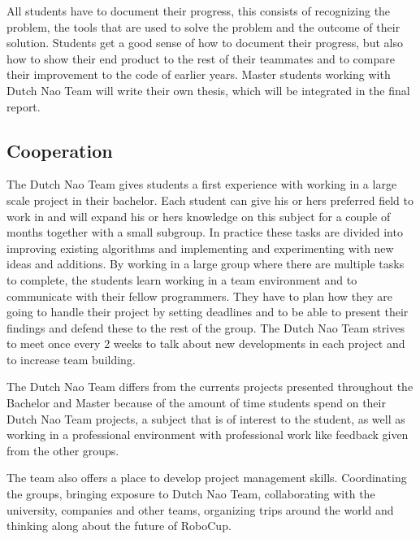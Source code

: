 \documentclass[11pt]{article}
\begin{document}
All students have to document their progress, this consists of recognizing the problem, the tools that are used to solve the problem and the outcome of their solution. Students get a good sense of how to document their progress, but also how to show their end product to the rest of their teammates and to compare their improvement to the code of earlier years. 
Master students working with Dutch Nao Team will write their own thesis, which will be integrated in the final report.   

\subsection{Cooperation}
The Dutch Nao Team gives students a first experience with working in a large scale project in their bachelor. Each student can give his or hers preferred field to work in and will expand his or hers knowledge on this subject for a couple of months together with a small subgroup. In practice these tasks are divided into improving existing algorithms and implementing and experimenting with new ideas and additions. By working in a large group where there are multiple tasks to complete, the students learn working in a team environment and to communicate with their fellow programmers. They have to plan how they are going to handle their project by setting deadlines and to be able to present their findings and defend these to the rest of the group. The Dutch Nao Team strives to meet once every 2 weeks to talk about new developments in each project and to increase team building. 

The Dutch Nao Team differs from the currents projects presented throughout the Bachelor and Master because of the amount of time students spend on their Dutch Nao Team projects, a subject that is of interest to the student,  as well as working in a professional environment with professional work like feedback given from the other groups.

The team also offers a place to develop project management skills. Coordinating the groups, bringing exposure to Dutch Nao Team, collaborating with the university, companies and other teams, organizing trips around the world and thinking along about the future of RoboCup. 
\end{document}
